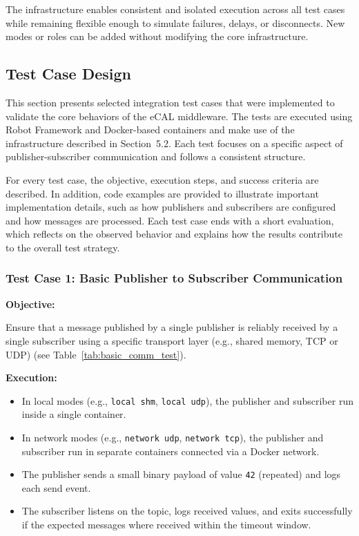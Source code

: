 \vspace{1em}
The infrastructure enables consistent and isolated execution across all test cases while remaining flexible enough to simulate failures, delays, or disconnects. New modes or roles can be added without modifying the core infrastructure.

\subsection{Test Case Design}

This section presents selected integration test cases that were implemented to validate the core behaviors of the eCAL middleware. The tests are executed using Robot Framework and Docker-based containers and make use of the infrastructure described in Section~5.2. Each test focuses on a specific aspect of publisher-subscriber communication and follows a consistent structure.

\vspace{1em}
For every test case, the objective, execution steps, and success criteria are described. In addition, code examples are provided to illustrate important implementation details, such as how publishers and subscribers are configured and how messages are processed. Each test case ends with a short evaluation, which reflects on the observed behavior and explains how the results contribute to the overall test strategy.

\vspace{1em}
\subsubsection*{Test Case 1: Basic Publisher to Subscriber Communication}

\textbf{Objective:}

\vspace{0.4em}
Ensure that a message published by a single publisher is reliably received by a single subscriber using a specific transport layer (e.g., shared memory, TCP or UDP) (see Table~\ref{tab:basic_comm_test}).

\vspace{0.5em}
\textbf{Execution:}
\begin{itemize}
	\item In local modes (e.g., \texttt{local shm}, \texttt{local udp}), the publisher and subscriber run inside a single container.
	\item In network modes (e.g., \texttt{network udp}, \texttt{network tcp}), the publisher and subscriber run in separate containers connected via a Docker network.
	\item The publisher sends a small binary payload of value \texttt{42} (repeated) and logs each send event.
	\item The subscriber listens on the topic, logs received values, and exits successfully if the expected messages where received within the timeout window.
\end{itemize}


